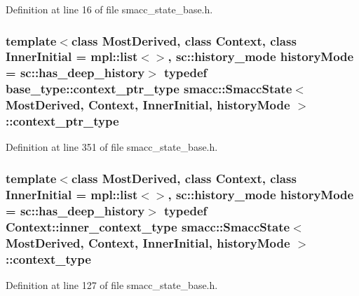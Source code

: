 Definition at line 16 of file smacc\+\_\+state\+\_\+base.\+h.

\subsubsection[{\texorpdfstring{context\+\_\+ptr\+\_\+type}{context_ptr_type}}]{\setlength{\rightskip}{0pt plus 5cm}template$<$class Most\+Derived, class Context, class Inner\+Initial = mpl\+::list$<$$>$, sc\+::history\+\_\+mode history\+Mode = sc\+::has\+\_\+deep\+\_\+history$>$ typedef base\+\_\+type\+::context\+\_\+ptr\+\_\+type {\bf smacc\+::\+Smacc\+State}$<$ Most\+Derived, Context, Inner\+Initial, history\+Mode $>$\+::{\bf context\+\_\+ptr\+\_\+type}}\hypertarget{classsmacc_1_1SmaccState_a0e15b77514301039f6bc093a9d3f6425}{}\label{classsmacc_1_1SmaccState_a0e15b77514301039f6bc093a9d3f6425}


Definition at line 351 of file smacc\+\_\+state\+\_\+base.\+h.

\subsubsection[{\texorpdfstring{context\+\_\+type}{context_type}}]{\setlength{\rightskip}{0pt plus 5cm}template$<$class Most\+Derived, class Context, class Inner\+Initial = mpl\+::list$<$$>$, sc\+::history\+\_\+mode history\+Mode = sc\+::has\+\_\+deep\+\_\+history$>$ typedef Context\+::inner\+\_\+context\+\_\+type {\bf smacc\+::\+Smacc\+State}$<$ Most\+Derived, Context, Inner\+Initial, history\+Mode $>$\+::{\bf context\+\_\+type}}\hypertarget{classsmacc_1_1SmaccState_a65c128d05dbcadbf817f41ba20b8fa01}{}\label{classsmacc_1_1SmaccState_a65c128d05dbcadbf817f41ba20b8fa01}


Definition at line 127 of file smacc\+\_\+state\+\_\+base.\+h.

